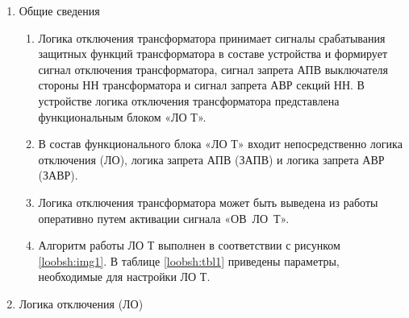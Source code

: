 
\color{black}

\begin{enumerate}

\item Общие сведения
\begin{enumerate}

\item
Логика отключения трансформатора принимает сигналы срабатывания защитных функций трансформатора в составе устройства и формирует сигнал отключения трансформатора, сигнал запрета АПВ выключателя стороны НН трансформатора и сигнал запрета АВР секций НН. В устройстве логика отключения трансформатора представлена функциональным блоком «ЛО Т».

\item
В состав функционального блока «ЛО Т» входит непосредственно логика отключения (ЛО), логика запрета АПВ (ЗАПВ) и логика запрета АВР (ЗАВР).


\item
Логика отключения трансформатора может быть выведена из работы оперативно путем активации сигнала «ОВ~ЛО~Т».

\item
Алгоритм работы ЛО Т выполнен в соответствии с рисунком \ref{loobsh:img1}. В таблице \ref{loobsh:tbl1} приведены параметры, необходимые для настройки ЛО Т.


\end{enumerate}


\item Логика отключения (ЛО)
\begin{enumerate}


\end{enumerate}
\end{enumerate}

